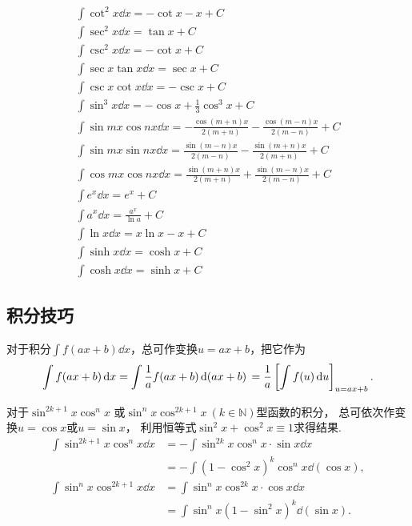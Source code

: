 \begin{gather*}
	\int \cot^2 x \dd{x}
	= -\cot x - x + C \\
	\int \sec^2 x \dd{x}
	= \tan x + C \\
	\int \csc^2 x \dd{x}
	= -\cot x + C \\
	\int \sec x \tan x \dd{x}
	= \sec x + C \\
	\int \csc x \cot x \dd{x}
	= -\csc x + C \\
	\int \sin^3 x \dd{x}
	= -\cos x + \frac{1}{3} \cos^3 x + C \\
	\int \sin mx \cos nx \dd{x}
	= -\frac{\cos(m+n)x}{2(m+n)}
		- \frac{\cos(m-n)x}{2(m-n)}
		+ C \\
	\int \sin mx \sin nx \dd{x}
	= \frac{\sin(m-n)x}{2(m-n)}
		- \frac{\sin(m+n)x}{2(m+n)}
		+ C \\
	\int \cos mx \cos nx \dd{x}
	= \frac{\sin(m+n)x}{2(m+n)}
		+ \frac{\sin(m-n)x}{2(m-n)}
		+ C \\
	\int e^x \dd{x}
	= e^x + C \\
	\int a^x \dd{x}
	= \frac{a^x}{\ln a} + C \\
	\int \ln x \dd{x}
	= x \ln x - x + C \\
	\int \sinh x \dd{x}
	= \cosh x + C \\
	\int \cosh x \dd{x}
	= \sinh x + C
\end{gather*}

\subsection{积分技巧}
对于积分\(\int f(ax+b) \dd{x}\)，总可作变换\(u=ax+b\)，把它作为\[
	\int f(ax+b) \dd{x}
	= \int \frac{1}{a} f(ax+b) \dd{(ax+b)} \\
	= \frac{1}{a} \left[ \int f(u) \dd{u} \right]_{u=ax+b}.
\]

对于\(\sin^{2k+1} x \cos^n x\)
或\(\sin^n x \cos^{2k+1} x\ (k \in \mathbb{N})\)型函数的积分，
总可依次作变换\(u=\cos x\)或\(u=\sin x\)，
利用恒等式\(\sin^2 x + \cos^2 x \equiv 1\)求得结果.
\begin{align*}
	\int \sin^{2k+1} x \cos^n x \dd{x}
	&= - \int \sin^{2k} x \cos^n x \cdot \sin x \dd{x} \\
	&= - \int (1-\cos^2 x)^k \cos^n x \dd(\cos x), \\
	\int \sin^n x \cos^{2k+1} x \dd{x}
	&= \int \sin^n x \cos^{2k} x \cdot \cos x \dd{x} \\
	&= \int \sin^n x (1-\sin^2 x)^k \dd(\sin x).
\end{align*}

